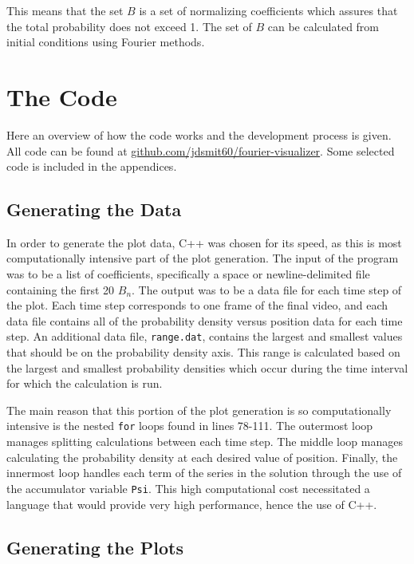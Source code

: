 \documentclass[11pt]{article}
\begin{document}
\noindent This means that the set $B$ is a set of normalizing coefficients which assures that the total probability does not exceed 1. The set of $B$ can be calculated from initial conditions using Fourier methods.



\section{The Code}

Here an overview of how the code works and the development process is given. All code can be found at \url{github.com/jdsmit60/fourier-visualizer}. Some selected code is included in the appendices.

\subsection{Generating the Data}

In order to generate the plot data, C++ was chosen for its speed, as this is most computationally intensive part of the plot generation. The input of the program was to be a list of coefficients, specifically a space or newline-delimited file containing the first 20 $B_n$. The output was to be a data file for each time step of the plot. Each time step corresponds to one frame of the final video, and each data file contains all of the probability density versus position data for each time step. An additional data file, \texttt{range.dat}, contains the largest and smallest values that should be on the probability density axis. This range is calculated based on the largest and smallest probability densities which occur during the time interval for which the calculation is run.

The main reason that this portion of the plot generation is so computationally intensive is the nested \texttt{for} loops found in lines 78-111. The outermost loop manages splitting calculations between each time step. The middle loop manages calculating the probability density at each desired value of position. Finally, the innermost loop handles each term of the series in the solution through the use of the accumulator variable \texttt{Psi}. This high computational cost necessitated a language that would provide very high performance, hence the use of C++.

\subsection{Generating the Plots}
\end{document}
